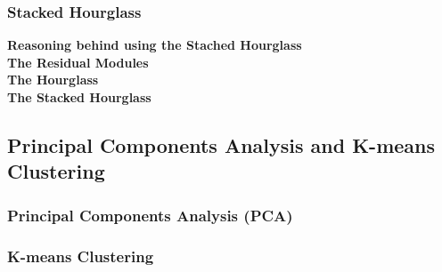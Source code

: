 \documentclass[./main.tex]{subfiles}
\begin{document}
\subsubsection{Stacked Hourglass}
\textbf{Reasoning behind using the Stached Hourglass} \\
\textbf{The Residual Modules}\\
\textbf{The Hourglass}\\
\textbf{The Stacked Hourglass}

\subsection{Principal Components Analysis and K-means Clustering}
\subsubsection{Principal Components Analysis (PCA)}
\subsubsection{K-means Clustering}
\end{document}
